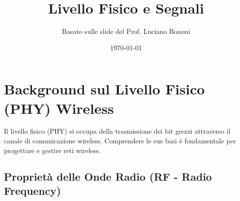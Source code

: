 

\title{Livello Fisico e Segnali}
\author{Basato sulle slide del Prof. Luciano Bononi}
\date{\today}



\maketitle
\tableofcontents
\newpage

\section{Background sul Livello Fisico (PHY) Wireless}
Il livello fisico (PHY) si occupa della trasmissione dei bit grezzi attraverso il canale di comunicazione wireless. Comprendere le sue basi è fondamentale per progettare e gestire reti wireless.

\subsection{Proprietà delle Onde Radio (RF - Radio Frequency)}

